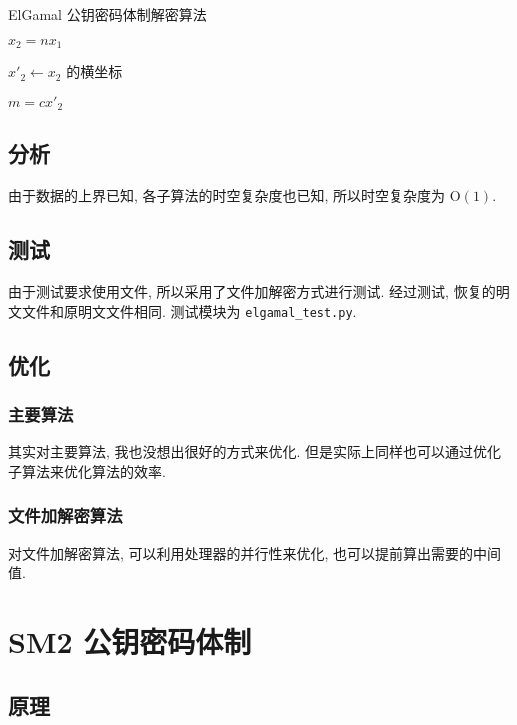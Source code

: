 \documentclass[12pt,a4paper]{article}
\begin{document}
\begin{algorithm}[H]
\caption{ElGamal 公钥密码体制解密算法}

$ x_2 = n x_1 $

$ x'_2 \leftarrow x_2 $ 的横坐标

$ m = c x'_2 $

\end{algorithm}

\newpage

\subsection*{分析}

由于数据的上界已知, 各子算法的时空复杂度也已知, 所以时空复杂度为 $ \mathrm{O}(1) $. 

\subsection*{测试}

由于测试要求使用文件, 所以采用了文件加解密方式进行测试. 经过测试, 恢复的明文文件和原明文文件相同. 测试模块为 \verb|elgamal_test.py|.

\subsection*{优化}

\subsubsection*{主要算法}

其实对主要算法, 我也没想出很好的方式来优化. 但是实际上同样也可以通过优化子算法来优化算法的效率. 

\subsubsection*{文件加解密算法}

对文件加解密算法, 可以利用处理器的并行性来优化, 也可以提前算出需要的中间值. 

\section*{SM2 公钥密码体制}

\subsection*{原理}
\end{document}
